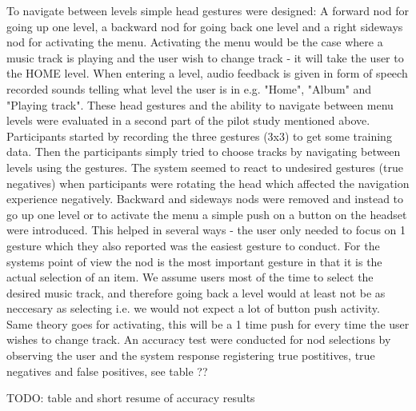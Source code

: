 To navigate between levels simple head gestures were designed: A forward nod for going up one level, a backward nod for going back one level and a right sideways nod for activating the menu. Activating the menu would be the case where a music track is playing and the user wish to change track - it will take the user to the HOME level. When entering a level, audio feedback is given in form of speech recorded sounds telling what level the user is in e.g. "Home", "Album" and "Playing track". These head gestures and the ability to navigate between menu levels were evaluated in a second part of the pilot study mentioned above. Participants started by recording the three gestures (3x3) to get some training data. Then the participants simply tried to choose tracks by navigating between levels using the gestures. The system seemed to react to undesired gestures (true negatives) when participants were rotating the head which affected the navigation experience negatively. Backward and sideways nods were removed and instead to go up one level or to activate the menu a simple push on a button on the headset were introduced. This helped in several ways - the user only needed to focus on 1 gesture which they also reported was the easiest gesture to conduct. For the systems point of view the nod is the most important gesture in that it is the actual selection of an item. We assume users most of the time to select the desired music track, and therefore going back a level would at least not be as neccesary as selecting i.e. we would not expect a lot of button push activity. Same theory goes for activating, this will be a 1 time push for every time the user wishes to change track. An accuracy test were conducted for nod selections by observing the user and the system response registering true postitives, true negatives and false positives, see table ??

TODO: table and short resume of accuracy results

























